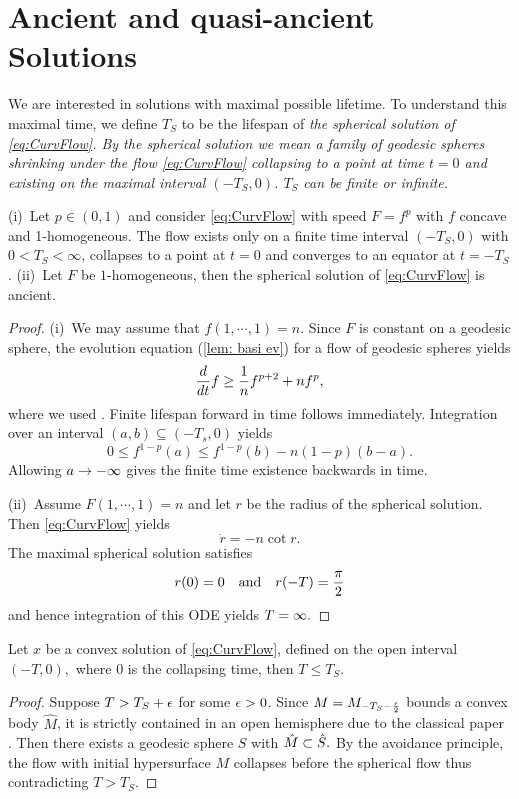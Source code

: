 \documentclass{amsart}
\begin{document}
\section{Ancient and quasi-ancient Solutions}\label{quasi}
We are interested in solutions with maximal possible lifetime. To understand this maximal time, we define $T_S$ to be the lifespan of \it{the spherical solution} of \eqref{eq:CurvFlow}. By the spherical solution we mean a family of geodesic spheres shrinking under the flow \eqref{eq:CurvFlow} collapsing to a point at time $t=0$ and existing on the maximal interval \((-T_S, 0)\). \(T_S\) can be finite or infinite.
\begin{lemma}
 (i)~Let $p\in(0,1)$ and consider \eqref{eq:CurvFlow} with speed \(F = f^p\) with \(f\) concave and 1-homogeneous. The flow exists only on a finite time interval \((-T_S,0)\) with \(0 < T_S < \infty\), collapses to a point at \(t=0\) and converges to an equator at \(t=-T_S\).
(ii)~Let $F$ be $1$-homogeneous, then the spherical solution of \eqref{eq:CurvFlow} is ancient.
\end{lemma}
\begin{proof}
(i)~We may assume that $f(1,\cdots,1)=n.$
Since $F$ is constant on a geodesic sphere, the evolution equation (\ref{lem: basi ev}) for a flow of geodesic spheres yields
$$\frac{d}{dt}f\geq \frac{1}{n} f^{p+2}+ nf^{p},$$
where we used \cite[Lemma~2.2.19, Lemma~2.2.20]{Gerhardt:/2006}.
Finite lifespan forward in time follows immediately. Integration over an interval $(a,b) \subseteq (-T_s, 0)$ yields
$$0\leq f^{1-p}(a)\leq f^{1-p}(b)-n(1-p)(b-a).$$
Allowing $a\rightarrow-\infty$ gives the finite time existence backwards in time.

(ii)~Assume $F(1,\cdots,1)=n$ and let $r$ be the radius of the spherical solution. Then \eqref{eq:CurvFlow} yields
\[\dot{r}=-n\cot{r}.\]
The maximal spherical solution satisfies
\[r(0)=0\quad\text{and}\quad r(-T)=\frac{\pi}{2}\]
and hence integration of this ODE yields $T=\infty.$
\end{proof}
\begin{lemma}
Let $x$ be a convex solution of \eqref{eq:CurvFlow}, defined on the open interval $(-T,0),$ where $0$ is the collapsing time, then $T\leq T_S.$
\end{lemma}
\begin{proof}
Suppose $T>T_S+\epsilon$ for some $\epsilon>0$. Since $M=M_{-T_S-\frac{\epsilon}{2}}$ bounds a convex body $\hat{M}$, it is strictly contained in an open hemisphere due to the classical paper \cite{CarmoWarner:/1970}. Then there exists a geodesic sphere $S$ with $\hat{M}\subset\hat{S}.$ By the avoidance principle, the flow with initial hypersurface $M$ collapses before the spherical flow thus contradicting $T>T_S$.
\end{proof}
\end{document}

